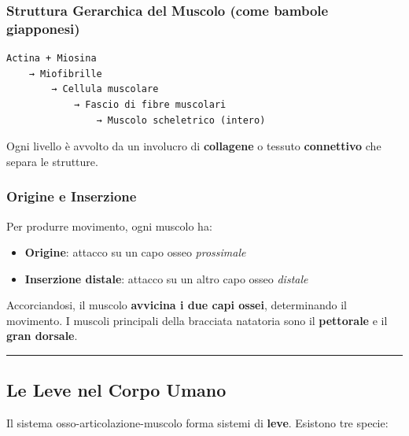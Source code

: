 \documentclass[a4paper,11pt]{article}
\providecommand{\tightlist}{%
  \setlength{\itemsep}{0pt}\setlength{\parskip}{0pt}}
\begin{document}
\subsubsection{Struttura Gerarchica del Muscolo (come bambole
      giapponesi)}\label{struttura-gerarchica-del-muscolo-come-bambole-giapponesi}

\begin{verbatim}
Actina + Miosina
    → Miofibrille
        → Cellula muscolare
            → Fascio di fibre muscolari
                → Muscolo scheletrico (intero)
\end{verbatim}

Ogni livello è avvolto da un involucro di \textbf{collagene} o tessuto
\textbf{connettivo} che separa le strutture.

\subsubsection{Origine e Inserzione}\label{origine-e-inserzione}

Per produrre movimento, ogni muscolo ha:

\begin{itemize}
      \tightlist
      \item
            \textbf{Origine}: attacco su un capo osseo \emph{prossimale}
      \item
            \textbf{Inserzione distale}: attacco su un altro capo osseo
            \emph{distale}
\end{itemize}

Accorciandosi, il muscolo \textbf{avvicina i due capi ossei},
determinando il movimento. I muscoli principali della bracciata
natatoria sono il \textbf{pettorale} e il \textbf{gran dorsale}.

\begin{center}\rule{0.5\linewidth}{0.5pt}\end{center}

\subsection{Le Leve nel Corpo Umano}\label{le-leve-nel-corpo-umano}

Il sistema osso-articolazione-muscolo forma sistemi di \textbf{leve}.
Esistono tre specie:
\end{document}
